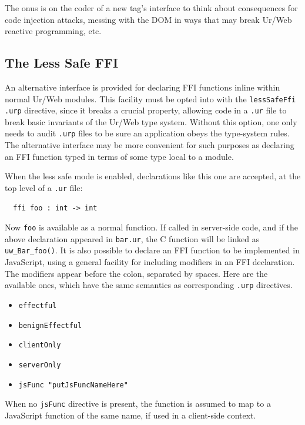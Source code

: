 \documentclass{article}
\begin{document}
The onus is on the coder of a new tag's interface to think about consequences for code injection attacks, messing with the DOM in ways that may break Ur/Web reactive programming, etc.

\subsection{The Less Safe FFI}
\label{sec:lessSafeFfi}

An alternative interface is provided for declaring FFI functions inline within normal Ur/Web modules.  This facility must be opted into with the \texttt{lessSafeFfi} \texttt{.urp} directive, since it breaks a crucial property, allowing code in a \texttt{.ur} file to break basic invariants of the Ur/Web type system.  Without this option, one only needs to audit \texttt{.urp} files to be sure an application obeys the type-system rules.  The alternative interface may be more convenient for such purposes as declaring an FFI function typed in terms of some type local to a module.

When the less safe mode is enabled, declarations like this one are accepted, at the top level of a \texttt{.ur} file:
\begin{verbatim}
  ffi foo : int -> int
\end{verbatim}

Now \texttt{foo} is available as a normal function.  If called in server-side code, and if the above declaration appeared in \texttt{bar.ur}, the C function will be linked as \texttt{uw\_Bar\_foo()}.  It is also possible to declare an FFI function to be implemented in JavaScript, using a general facility for including modifiers in an FFI declaration.  The modifiers appear before the colon, separated by spaces.  Here are the available ones, which have the same semantics as corresponding \texttt{.urp} directives.
\begin{itemize}
\item \texttt{effectful}
\item \texttt{benignEffectful}
\item \texttt{clientOnly}
\item \texttt{serverOnly}
\item \texttt{jsFunc "putJsFuncNameHere"}
\end{itemize}

When no \texttt{jsFunc} directive is present, the function is assumed to map to a JavaScript function of the same name, if used in a client-side context.
\end{document}
